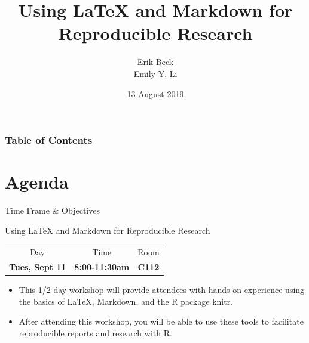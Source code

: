 \documentclass{beamer}
\title{Using LaTeX and Markdown for Reproducible Research}
\subtitle{}
\author{Erik Beck \\ Emily Y. Li}
\institute{US EPA \\ R User Group Workshop}
\date{13 August 2019}
\begin{document}
    \begin{frame}
        \maketitle
    \end{frame}

    \begin{frame}
        \frametitle{Table of Contents}
        \tableofcontents
    \end{frame}

\section{Agenda}

\begin{frame}{Time Frame \& Objectives}
\begin{exampleblock}{Using LaTeX and Markdown for Reproducible Research}
\begin{center}
    \begin{tabular}{c c c}
    Day & Time & Room \\
    \textbf{Tues, Sept 11} & \textbf{8:00-11:30am} & \textbf{C112}
\end{tabular}
\end{center}
\end{exampleblock}

\begin{itemize}
    \item This 1/2-day workshop will provide attendees with hands-on experience
using the basics of LaTeX, Markdown, and the R package knitr.
    \item After attending this workshop, you will be able to use these tools to
facilitate reproducible reports and research with R.
\end{itemize}
\end{frame}
\end{document}
